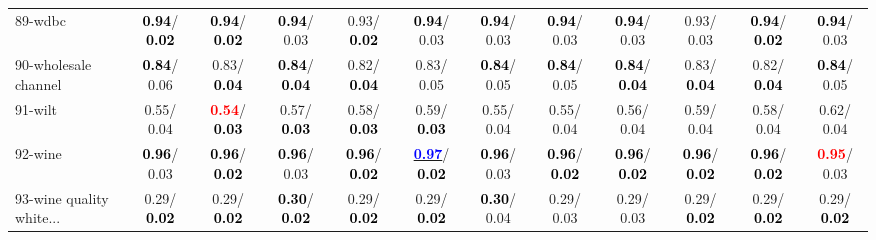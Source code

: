 \begin{table}[h]
\begin{center}
{\begin{tabular}{lc|c|c|c|c|c|c|c|c|c|c}
89-wdbc & \textcolor{black}{\textbf{  0.94}}/\textcolor{black}{\textbf{  0.02}} & \textcolor{black}{\textbf{  0.94}}/\textcolor{black}{\textbf{  0.02}} & \textcolor{black}{\textbf{  0.94}}/  0.03 &   0.93/\textcolor{black}{\textbf{  0.02}} & \textcolor{black}{\textbf{  0.94}}/  0.03 & \textcolor{black}{\textbf{  0.94}}/  0.03 & \textcolor{black}{\textbf{  0.94}}/  0.03 & \textcolor{black}{\textbf{  0.94}}/  0.03 &   0.93/  0.03 & \textcolor{black}{\textbf{  0.94}}/\textcolor{black}{\textbf{  0.02}} & \textcolor{black}{\textbf{  0.94}}/  0.03 \\
90-wholesale channel & \textcolor{black}{\textbf{  0.84}}/  0.06 &   0.83/\textcolor{black}{\textbf{  0.04}} & \textcolor{black}{\textbf{  0.84}}/\textcolor{black}{\textbf{  0.04}} &   0.82/\textcolor{black}{\textbf{  0.04}} &   0.83/  0.05 & \textcolor{black}{\textbf{  0.84}}/  0.05 & \textcolor{black}{\textbf{  0.84}}/  0.05 & \textcolor{black}{\textbf{  0.84}}/\textcolor{black}{\textbf{  0.04}} &   0.83/\textcolor{black}{\textbf{  0.04}} &   0.82/\textcolor{black}{\textbf{  0.04}} & \textcolor{black}{\textbf{  0.84}}/  0.05 \\
91-wilt &   0.55/  0.04 & \textcolor{red}{\textbf{  0.54}}/\textcolor{black}{\textbf{  0.03}} &   0.57/\textcolor{black}{\textbf{  0.03}} &   0.58/\textcolor{black}{\textbf{  0.03}} &   0.59/\textcolor{black}{\textbf{  0.03}} &   0.55/  0.04 &   0.55/  0.04 &   0.56/  0.04 &   0.59/  0.04 &   0.58/  0.04 &   0.62/  0.04 \\
92-wine & \textcolor{black}{\textbf{  0.96}}/  0.03 & \textcolor{black}{\textbf{  0.96}}/\textcolor{black}{\textbf{  0.02}} & \textcolor{black}{\textbf{  0.96}}/  0.03 & \textcolor{black}{\textbf{  0.96}}/\textcolor{black}{\textbf{  0.02}} & \underline{\textcolor{blue}{\textbf{  0.97}}}/\textcolor{black}{\textbf{  0.02}} & \textcolor{black}{\textbf{  0.96}}/  0.03 & \textcolor{black}{\textbf{  0.96}}/\textcolor{black}{\textbf{  0.02}} & \textcolor{black}{\textbf{  0.96}}/\textcolor{black}{\textbf{  0.02}} & \textcolor{black}{\textbf{  0.96}}/\textcolor{black}{\textbf{  0.02}} & \textcolor{black}{\textbf{  0.96}}/\textcolor{black}{\textbf{  0.02}} & \textcolor{red}{\textbf{  0.95}}/  0.03 \\ \hline
93-wine quality white... &   0.29/\textcolor{black}{\textbf{  0.02}} &   0.29/\textcolor{black}{\textbf{  0.02}} & \textcolor{black}{\textbf{  0.30}}/\textcolor{black}{\textbf{  0.02}} &   0.29/\textcolor{black}{\textbf{  0.02}} &   0.29/\textcolor{black}{\textbf{  0.02}} & \textcolor{black}{\textbf{  0.30}}/  0.04 &   0.29/  0.03 &   0.29/  0.03 &   0.29/\textcolor{black}{\textbf{  0.02}} &   0.29/\textcolor{black}{\textbf{  0.02}} &   0.29/\textcolor{black}{\textbf{  0.02}} \\

\end{tabular}}
\end{center}
\end{table}
